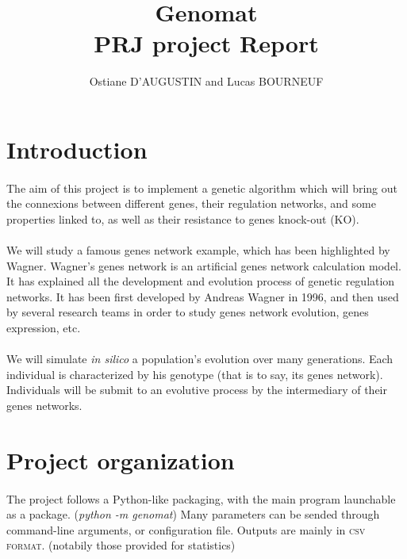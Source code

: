 \documentclass[]{report} %
\title{Genomat\\PRJ project Report}
\author{Ostiane D'AUGUSTIN and Lucas BOURNEUF}
\date{}
\begin{document}
        \maketitle %




\section*{Introduction}
	\paragraph*{}
	The aim of this project is to implement a genetic algorithm which will bring out the connexions between different genes, 
        their regulation networks, and some properties linked to, as well as their resistance to genes knock-out (KO).
	\paragraph*{}
	We will study a famous genes network example, which has been highlighted by Wagner. Wagner's genes network is an artificial genes network calculation model. 
        It has explained all the development and evolution process of genetic regulation networks. It has been first developed by Andreas Wagner in 1996, 
        and then used by several research teams in order to study genes network evolution, genes expression, etc.
	\paragraph*{}
	We will simulate \textit{in silico} a population's evolution over many generations. Each individual is characterized by his genotype 
        (that is to say, its genes network). 
        Individuals will be submit to an evolutive process by the intermediary of their genes networks.




\section*{Project organization}
	\paragraph*{}
        The project follows a Python-like packaging, with the main program launchable as a package. (\textit{python -m genomat})
        Many parameters can be sended through command-line arguments, or configuration file.
        Outputs are mainly in \textsc{csv format}. (notabily those provided for statistics)
\end{document}
